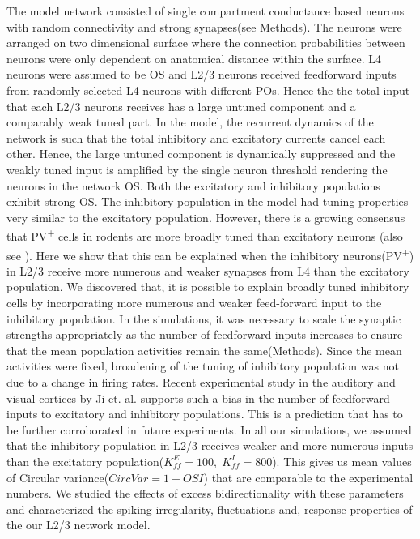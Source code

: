 The model network consisted of single compartment conductance based neurons with random connectivity and strong synapses(see Methods). The neurons were arranged on two dimensional surface where the connection probabilities between neurons were only dependent on anatomical distance within the surface. L4 neurons were assumed to be OS and L2/3 neurons received feedforward inputs from randomly selected L4 neurons with different POs. Hence the the total input that each L2/3 neurons receives has a large untuned component and a comparably weak tuned part. In the model, the recurrent dynamics of the network is such that the total inhibitory and excitatory currents cancel each other. Hence, the large untuned component is dynamically suppressed and the weakly tuned input is amplified by the single neuron threshold rendering the neurons in the network OS. Both the excitatory and inhibitory populations exhibit strong OS. The inhibitory population in the model had tuning properties very similar to the excitatory population. However, there is a growing consensus that PV\textsuperscript{+} cells in rodents are more broadly tuned than excitatory neurons \cite{niell2008highly, kerlin2010broadly, liu2009visual, sohya2007gabaergic, kameyama2010difference} (also see \cite{Runyan2010, Ma2010}). Here we show that this can be explained when the inhibitory neurons(PV\textsuperscript{+}) in L2/3 receive more numerous and weaker synapses from L4 than the excitatory population.  We discovered that, it is possible to explain broadly tuned inhibitory cells by incorporating more numerous and weaker feed-forward input to the inhibitory population. In the simulations, it was necessary to scale the synaptic strengths appropriately as the number of feedforward inputs increases to ensure that the mean population activities remain the same(Methods). Since the mean activities were fixed, broadening of the tuning of inhibitory population was not due to a change in firing rates. Recent experimental study in the auditory and visual cortices by Ji et. al. \cite{Ji2015} supports such a bias in the number of feedforward inputs to excitatory and inhibitory populations. This is a prediction that has to be further corroborated in future experiments. In all our simulations, we assumed that the inhibitory population in L2/3 receives weaker and more numerous inputs than the excitatory population($K_{ff}^{E} = 100, \; K_{ff}^{I} = 800$). This gives us mean values of Circular variance($CircVar = 1 - OSI$) that are comparable to the experimental numbers. We studied the effects of excess bidirectionality with these parameters and characterized the spiking irregularity, fluctuations and, response properties of the our L2/3 network model.  \\

